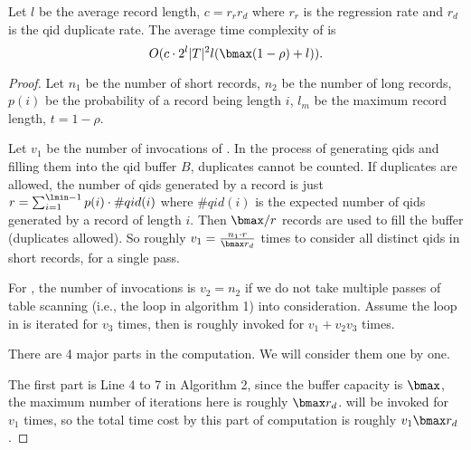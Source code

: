 \begin{theorem}
Let %
$l$ be the average record length, 
$c = r_r r_d$ where $r_r$ is the regression rate and $r_d$ is the qid duplicate rate.
The average time complexity of \PartialSuppressor is 
\[ O(c \cdot 2^l |T|^2 l (\bmax (1-\rho) + l)). \]
\end{theorem}
\begin{proof}

Let $n_1$ be the number of short records,
$n_2$ be the number of long records,
$p(i)$ be the probability of a record being length $i$,
$l_m$ be the maximum record length, 
$t=1-\rho$.

Let $v_1$ be the number of invocations of \HandleShortRecords.
In the process of generating qids and filling them into the qid buffer $B$, 
duplicates cannot be counted. 
If duplicates are allowed, the number of qids generated by a record is 
just $r=\sum_{i=1}^{\lmin-1} p(i)\cdot\#qid(i)$ where
$\#qid(i)$ is the expected number of qids generated by a record of length $i$.
Then $\bmax/r$ records are used to fill the buffer (duplicates allowed).
So roughly $v_1=\frac{n_1\cdot r}{\bmax r_d}$ times to consider all distinct qids 
in short records, for a single pass.

For \HandleLongRecord, the number of invocations is $v_2=n_2$ if 
we do not take multiple passes of table scanning (i.e., the loop in algorithm 1) into consideration. 
Assume the loop in \HandleLongRecord is iterated for $v_3$ times, then \SanitizeBuffer is 
roughly invoked for $v_1 + v_2 v_3$ times. 

There are 4 major parts in the computation. We will consider them one by one.

The first part is Line 4 to 7 in Algorithm 2, since the buffer capacity is $\bmax$, 
the maximum number of iterations here is roughly $\bmax r_d$. 
\HandleShortRecords will be invoked for $v_1$ times, so 
the total time cost by this part of computation is roughly $v_1 \bmax r_d$. 


\end{proof}
